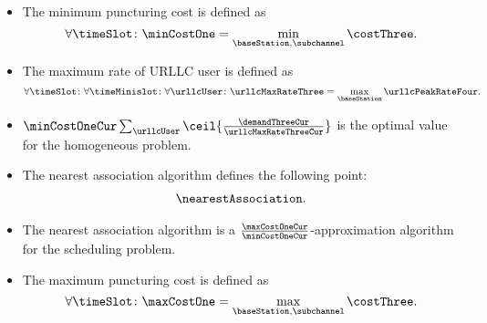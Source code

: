 \begin{frame}
  \begin{itemize}
    \item The minimum puncturing cost is defined as
      \begin{equation}
        \forall\timeSlot \colon \minCostOne = \min_{\baseStation, \subchannel}{\costThree}.
      \end{equation}
    \item The maximum rate of URLLC user is defined as
      \begin{equation}
        \forall\timeSlot \colon \forall\timeMinislot \colon \forall\urllcUser \colon \urllcMaxRateThree = \max_{\baseStation}{\urllcPeakRateFour}.
      \end{equation}
  \end{itemize}
\end{frame}

\begin{frame}
  \begin{itemize}
    \item $\minCostOneCur \sum_{\urllcUser}{\ceil{\frac{\demandThreeCur}{\urllcMaxRateThreeCur}}}$ is the optimal value for the homogeneous problem.
  \end{itemize}
\end{frame}

\begin{frame}
  \begin{itemize}
    \item The nearest association algorithm defines the following point:
      \begin{align*}
        \nearestAssociation.
      \end{align*}
  \end{itemize}
\end{frame}

\begin{frame}
  \begin{itemize}
    \item The nearest association algorithm is a $\frac{\maxCostOneCur}{\minCostOneCur}$-approximation algorithm for the scheduling problem\proofFootnote.
  \end{itemize}
\end{frame}

\begin{frame}
  \begin{itemize}
    \item The maximum puncturing cost is defined as
      \begin{equation}
        \forall\timeSlot \colon \maxCostOne = \max_{\baseStation, \subchannel}{\costThree}.
      \end{equation}
  \end{itemize}
\end{frame}

